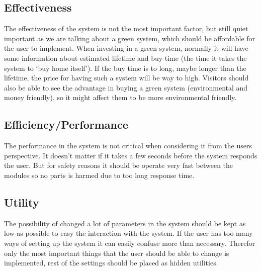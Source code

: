 \subsection{Effectiveness}
The effectiveness of the system is not the most important factor, but still quiet important as we are talking about a green system, which should be
affordable for the user to implement. When investing in a green system, normally it will have some information about estimated lifetime and buy time (the time
it takes the system to `buy home itself'). If the buy time is to long, maybe longer than the lifetime, the price for having such a system will be way to high. 
Visitors should also be able to see the advantage in buying a green system (environmental and money friendly), so it might affect them to be more environmental friendly. 
\subsection{Efficiency/Performance}
The performance in the system is not critical when considering it from the users perspective. It doesn't matter if it takes a few seconds before the system responds the user. But for safety reasons it should be operate very fast between the modules so no parts is harmed due to too long response time.
\subsection{Utility}
The possibility of changed a lot of parameters in the system should be kept as low as possible to easy the interaction with the system. If the user has too many ways of setting up the system it can easily confuse more than necessary. Therefor only the most important things that the user should be able to change is implemented, rest of the settings should be placed as hidden utilities. 
